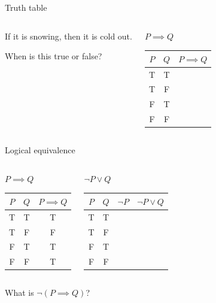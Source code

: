 \documentclass [aspectratio=169]{beamer}
\begin{document}
\begin{frame}{Truth table}
    \begin{columns}
        \begin{center}
If it is snowing, then it is cold out. 

\vspace{2em}

\textcolor{deptoran}{When is this true or false?}

\end{center}

        \begin{center}
        $P \implies Q$ \\
        \vspace{1.5em}
        \begin{tabular}{|c|c| c|}
\hline
     $P$& $Q$ &  $P \implies Q$ \\ \hline
     T& T &  \\ \hline
     T & F &  \\ \hline
     F & T & \\ \hline
     F & F &  \\ \hline
\end{tabular}
\end{center}
\end{columns}
\end{frame}


\begin{frame}{Logical equivalence}
    \begin{columns}
        \begin{center}
        $P \implies Q$ \\
        \vspace{1.5em}
\begin{tabular}{|c|c| c|}
\hline
     $P$& $Q$ &  $P \implies Q$ \\ \hline
     T& T & T \\ \hline
     T & F & F \\ \hline
     F & T & T \\ \hline
     F & F & T \\ \hline
\end{tabular}
\end{center}
        \begin{center}
        $\neg P \vee Q$ \\
        \vspace{1.5em}
        \begin{tabular}{|c | c | c | c|}
\hline
     $P$& $Q$ & $\neg P$ & $\neg P \vee Q$  \\ \hline
     T& T &  &  \\ \hline
     T & F &  &  \\ \hline
     F & T &   & \\ \hline
     F & F & & \\ \hline
\end{tabular}
\end{center}
\end{columns}
\vspace{2em}
\centering
What is $\neg (P \implies Q)$?
\end{frame}
\end{document}
